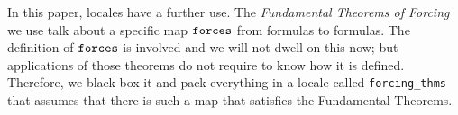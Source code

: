 In this paper, locales have a further use. The \emph{Fundamental
  Theorems of Forcing} we use talk about a specific map $\mathop{\mathtt{forces}}$
from formulas to formulas. The definition of $\mathop{\mathtt{forces}}$ is involved
and we will not dwell on this now; but applications of those theorems
do not require to know how it is defined. Therefore, we black-box it
and pack everything in a locale called \texttt{forcing\_thms} that
assumes that there is such a 
map that satisfies the Fundamental Theorems.



